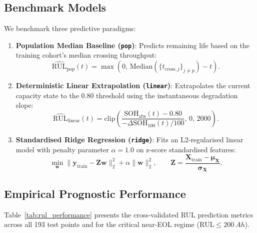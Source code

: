 \subsection{Benchmark Models}

We benchmark three predictive paradigms:
\begin{enumerate}
  \item \textbf{Population Median Baseline (\texttt{pop})}:
  Predicts remaining life based on the training cohort's median crossing
  throughput:
  \begin{equation}
    \widehat{\mathrm{RUL}}_{\mathrm{pop}}(t) = \max\left(0,\,
    \mathrm{Median}\left(\{t_{\mathrm{cross}, j}\}_{j \ne p}\right) - t\right).
  \end{equation}

  \item \textbf{Deterministic Linear Extrapolation (\texttt{linear})}:
  Extrapolates the current capacity state to the 0.80 threshold using the
  instantaneous degradation slope:
  \begin{equation}
    \widehat{\mathrm{RUL}}_{\mathrm{linear}}(t) = \mathrm{clip}\left(
    \frac{\mathrm{SOH}_{\mathrm{abs}}(t) - 0.80}
    {-\Delta\mathrm{SOH}_{100}(t) / 100},\, 0,\, 2000 \right).
  \end{equation}

  \item \textbf{Standardised Ridge Regression (\texttt{ridge})}:
  Fits an L2-regularised linear model with penalty parameter $\alpha = 1.0$
  on z-score standardised features:
  \begin{equation}
    \min_{\mathbf{w}} \|\mathbf{y}_{\mathrm{train}} - \mathbf{Z}\mathbf{w}\|_2^2
    + \alpha \|\mathbf{w}\|_2^2,
    \qquad
    \mathbf{Z} = \frac{\mathbf{X}_{\mathrm{train}} - \boldsymbol{\mu}_{\mathbf{X}}}
    {\boldsymbol{\sigma}_{\mathbf{X}}}.
  \end{equation}
\end{enumerate}

\subsection{Empirical Prognostic Performance}

Table~\ref{tab:rul_performance} presents the cross-validated RUL prediction
metrics across all 193 test points and for the critical near-EOL regime
($\mathrm{RUL} \le \SI{200}{Ah}$).

